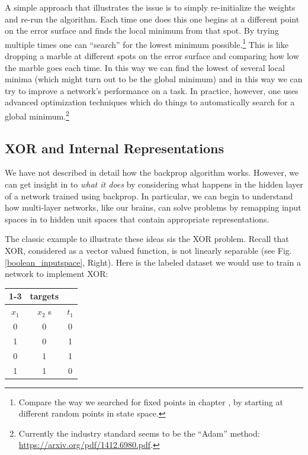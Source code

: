 A simple approach that illustrates the issue is to simply re-initialize the weights and re-run the algorithm. Each time one does this one begins at a different point on the error surface and finds the local minimum from that spot. By trying multiple times one can ``search'' for the lowest minimum possible.\footnote{Compare the way we searched for fixed points in chapter , by starting at different random points in state space.}  This is like dropping a marble at different spots on the error surface and comparing how low the marble goes each time. In this way we can find the lowest of several local minima (which might turn out to be the global minimum) and in this way we can try to improve a network's performance on a task. In practice, however, one uses advanced optimization techniques which do things to automatically search for a global minimum.\footnote{Currently the industry standard seems to be the ``Adam'' method: \url{https://arxiv.org/pdf/1412.6980.pdf}.}

\subsection{XOR and Internal Representations}

We have not described in detail how the backprop algorithm works. However, we can get insight in to \emph{what it does} by considering what happens in the hidden layer of a network trained using backprop. In particular, we can begin to understand how multi-layer networks, like our brains, can solve problems by remapping input spaces in to hidden unit spaces that contain appropriate representations. 

The classic example to illustrate these ideas sis the XOR problem. Recall that XOR, considered as a vector valued function, is not linearly separable (see Fig. \ref{boolean_inputspace}, Right). Here is the labeled dataset we would use to train a network to implement XOR:
\begin{center}
\begin{tabular}{| c | c || c | }
\cline{1-3}
\multicolumn{2}{| c || }{inputs}
 & \multicolumn{1}{c|}{targets} \\
\hline
  $x_1$  & $x_2$ s& $t_1$  \\
\hline
  0 & 0 & 0  \\
\hline
 1 & 0 & 1  \\
\hline
 0 & 1 & 1 \\
\hline
1 & 1 & 0 \\
\hline
\end{tabular}
\end{center}
	
